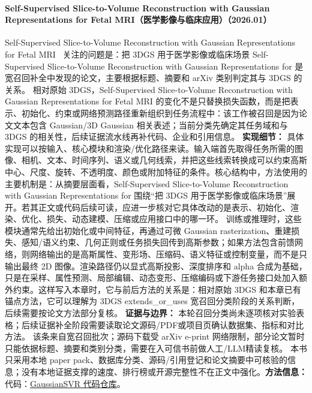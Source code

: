 \paragraph{Self-Supervised Slice-to-Volume Reconstruction with Gaussian Representations for Fetal MRI（医学影像与临床应用）（2026.01）}
Self-Supervised Slice-to-Volume Reconstruction with Gaussian Representations for Fetal MRI~\cite{2601_22990} 关注的问题是：把 3DGS 用于医学影像或临床场景 Self-Supervised Slice-to-Volume Reconstruction with Gaussian Representations for 是宽召回补全中发现的论文，主要根据标题、摘要和 arXiv 类别判定其与 3DGS 的关系。
相对原始 3DGS，Self-Supervised Slice-to-Volume Reconstruction with Gaussian Representations for Fetal MRI 的变化不是只替换损失函数，而是把表示、初始化、约束或网络预测路径重新组织到任务流程中：该工作被召回是因为论文文本包含 Gaussian/3D Gaussian 相关表述；当前分类先确定其任务域和与 3DGS 的相关性，后续证据流水线再补代码、企业和引用信息。
\textbf{实现细节：} 具体实现可以按输入、核心模块和渲染/优化路径来读。输入端首先取得任务所需的图像、相机、文本、时间序列、语义或几何线索，并把这些线索转换成可以约束高斯中心、尺度、旋转、不透明度、颜色或附加特征的条件。核心结构中，方法使用的主要机制是：从摘要层面看，Self-Supervised Slice-to-Volume Reconstruction with Gaussian Representations for 围绕“把 3DGS 用于医学影像或临床场景”展开。若其正文或代码后续可读，应进一步核对它具体改动的是表示、初始化、渲染、优化、损失、动态建模、压缩或应用接口中的哪一环。 训练或推理时，这些模块通常先给出初始化或中间特征，再通过可微 Gaussian rasterization、重建损失、感知/语义约束、几何正则或任务损失回传到高斯参数；如果方法包含前馈网络，则网络输出的是高斯属性、变形场、压缩码、语义特征或控制变量，而不是只输出最终 2D 图像。渲染路径仍以显式高斯投影、深度排序和 alpha 合成为基础，只是在采样、属性预测、局部编辑、动态变形、压缩编码或下游任务接口处加入额外约束。这样写入本章时，它与前后方法的关系是：相对原始 3DGS 和本章已有锚点方法，它可以理解为 3DGS extends\_or\_uses 宽召回分类阶段的关系判断，后续需要按论文方法部分复核。
\textbf{证据与边界：} 本轮召回分类尚未逐项核对实验表格；后续证据补全阶段需要读取论文源码/PDF或项目页确认数据集、指标和对比方法。 该条来自宽召回批次；源码下载受 arXiv e-print 网络限制，部分论文暂时只能依据标题、摘要和类别分类，需要在入可信书前做人工/LLM精读复核。 本书只采用本地 paper pack、数据库分类、源码/引用登记和论文摘要中可核验的信息；没有本地证据支撑的速度、排行榜或开源完整性不在正文中强化。\textbf{方法信息：} 代码：\href{https://github.com/yinsong0510/gaussiansvr-self-supervised-slice-to-volume-reconstruction-with-gaussian-representations}{GaussianSVR 代码仓库}。


